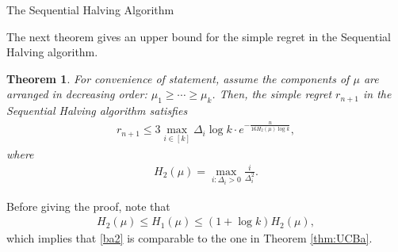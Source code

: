 \documentclass[letterpaper,11pt,openright,openany]{book}
\numberwithin{equation}{section}
\theoremstyle{plain}
\newtheorem{Th}{Theorem}[section]
\theoremstyle{definition}
\begin{document}
\begin{algorithm}[H]
\caption{The Sequential Halving Algorithm}
 \begin{algorithmic}[1]
\ENDFOR   
\end{algorithmic}
\label{alg:SH}
\end{algorithm}


The next theorem gives an upper bound for the simple regret in the Sequential Halving algorithm. 

\begin{Th}\label{thm:SH}
For convenience of statement, assume the components of $\mu$ are arranged in decreasing order: $\mu_1\geq\cdots\geq\mu_k$. Then, the simple regret $r_{n+1}$ in the Sequential Halving algorithm satisfies
\begin{align}
r_{n+1}\leq 3\max_{i\in [k]}\Delta_i\log k \cdot e^{-\frac{n}{16H_2(\mu)\log k}},\label{ba2}
\end{align}
where 
\begin{align*}
H_2(\mu) = \max_{i: \Delta_i>0}\frac{i}{\Delta_i^2}. 
\end{align*}
\end{Th}
Before giving the proof, note that 
\begin{align*}
H_2(\mu)\leq H_1(\mu)\leq (1+\log k)H_2(\mu),
\end{align*}
which implies that \eqref{ba2} is comparable to the one in Theorem \ref{thm:UCBa}. 
\end{document}
